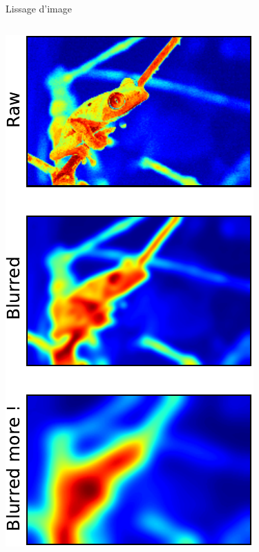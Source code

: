 \documentclass[8pt,a4paper]{beamer}
\begin{document}
\begin{frame}[containsverbatim]{Lissage d'image}
  \begin{columns}
  \includegraphics[width=\textwidth]{figures/grenouille_lissage.pdf} 
  
    \end{columns}
\end{frame}  
\end{document}
